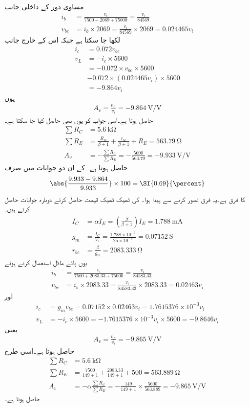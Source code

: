 مساوی دور کے داخلی جانب
\begin{align*}
i_b&=\frac{v_i}{7500+2069+75000}=\frac{v_i}{84569}\\
v_{be}&=i_b \times 2069=\frac{v_i}{84569} \times 2069=0.024465 v_i
\end{align*}
لکھا جا سکتا ہے جبکہ اس کے خارج جانب
\begin{align*}
i_c&=0.072 v_{be}\\
v_L&=-i_c \times 5600\\
&=-0.072 \times v_{be} \times 5600\\
&-0.072 \times \left(0.024465 v_i \right) \times 5600\\
&=-9.864 v_i
\end{align*}
 یوں
\begin{align*}
A_v=\frac{v_L}{v_i}=\SI{-9.864}{\volt \per \volt}
\end{align*}
حاصل ہوتا ہے۔اسی جواب کو یوں بھی حاصل کیا جا سکتا ہے۔
\begin{align*}
\sum R_C&=\SI{5.6}{\kilo \ohm}\\
\sum R_E&=\frac{R_B}{\beta+1}+\frac{r_{be}}{\beta+1}+R_E=\SI{563.79}{\ohm}\\
A_v&=-\frac{\sum R_C}{\sum R_E}=-\frac{5600}{563.79}=\SI{-9.933}{\volt \per \volt}
\end{align*}
 حاصل ہوتا ہے۔ کے ان دو جوابات میں صرف
\begin{align*}
\abs{\frac{9.933-9.864}{9.933}} \times 100=\SI{0.69}{\percent}
\end{align*}
کا فرق ہے۔یہ فرق  تصور کرنے سے پیدا ہوا۔ کی ٹھیک ٹھیک قیمت حاصل کرتے دوبارہ جوابات حاصل کرتے ہیں۔
\begin{align*}
I_C &=\alpha I_E= \left(\frac{\beta}{\beta+1}\right) I_E=\SI{1.788}{\milli \ampere}\\
g_m&=\frac{I_C}{V_T}=\frac{1.788 \times 10^{-3}}{25 \times 10^{-3}}=\SI{0.07152}{\siemens}\\
r_{be}&=\frac{\beta}{g_m}=\SI{2083.333}{\ohm}
\end{align*}
یوں پائے ماڈل استعمال کرتے ہوئے
\begin{align*}
i_b&=\frac{v_i}{7500+2083.33+75000}=\frac{v_i}{84583.33}\\
v_{be}&=i_b \times 2083.33=\frac{v_i}{84583.33} \times 2083.33=0.02463 v_i
\end{align*}
اور
\begin{align*}
i_c&=g_m v_{be}=0.07152 \times 0.02463 v_i=1.7615376 \times 10^{-3} v_i\\
v_L&=-i_c \times 5600=- 1.7615376 \times 10^{-3} v_i \times 5600=-9.8646 v_i
\end{align*}
یعنی
\begin{align*}
A_v=\frac{v_L}{v_i}=\SI{-9.865}{\volt \per \volt}
\end{align*}
حاصل ہوتا ہے۔اسی طرح
\begin{align*}
\sum R_C&=\SI{5.6}{\kilo \ohm}\\
\sum R_E&=\frac{7500}{149+1}+\frac{2083.33}{149+1}+500=\SI{563.889}{\ohm}\\
A_v&=- \alpha \frac{\sum R_C}{\sum R_E}=-\frac{149}{149+1} \times \frac{5600}{563.889}=\SI{-9.865}{\volt \per \volt}
\end{align*}
حاصل ہوتا ہے۔

